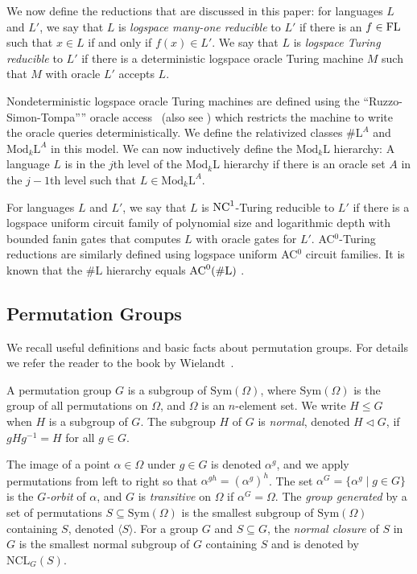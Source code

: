 \documentclass[11pt]{article}
\newcommand{\Mod}[1]{\ensuremath{\mathrm{Mod}_{#1}\mathrm{L}}}
\newcommand{\Lo}{\ensuremath{\mathrm{L}}}
\newcommand{\FL}{\mbox{\rm FL}}
\newcommand{\NC}{\mbox{\rm NC}}
\newcommand{\NCone}{\ensuremath{\NC^1}}
\newcommand{\ACzero}{\mbox{\ensuremath{\textrm{AC}^0}}}
\newcommand{\NCL}[2]{\ensuremath{\mathrm{NCL}_{#1}({#2})}}
\renewcommand{\angle}[1]{\langle #1\rangle}
\newcommand{\Sym}[1]{\ensuremath{\mathrm{Sym}\left({#1}\right)}}
\begin{document}
We now define the reductions that are discussed in this paper: for
languages $L$ and $L'$, we say that $L$ is \emph{logspace many-one
reducible} to $L'$ if there is an $f\in\FL$ such that $x\in L$ if and
only if $f(x)\in L'$. We say that $L$ is \emph{logspace Turing
reducible} to $L'$ if there is a deterministic logspace oracle Turing
machine $M$ such that $M$ with oracle $L'$ accepts $L$.

Nondeterministic logspace oracle Turing machines are defined using the
``Ruzzo-Simon-Tompa'''' oracle access~\cite{RST} (also see
\cite{allender96relationships,allender99complexity}) which restricts
the machine to write the oracle queries deterministically. We define
the relativized classes $\#\Lo^A$ and $\Mod{k}^A$ in this model. We
can now inductively define the $\Mod{k}$ hierarchy: A language $L$ is
in the $j$th level of the $\Mod{k}$ hierarchy if there is an oracle
set $A$ in the $j-1$th level such that $L\in\Mod{k}^A$.

For languages $L$ and $L'$, we say that $L$ is $\NCone$-Turing
reducible to $L'$ if there is a logspace uniform circuit family of
polynomial size and logarithmic depth with bounded fanin gates that
computes $L$ with oracle gates for $L'$. AC$^0$-Turing reductions are
similarly defined using logspace uniform AC$^0$ circuit families. It
is known that the $\#\Lo$ hierarchy equals $\ACzero(\#\Lo)$
\cite{allender96relationships}.

\subsection{Permutation Groups}

We recall useful definitions and basic facts about permutation
groups. For details we refer the reader to the book by
Wielandt~\cite{wielandt64finite}.

A permutation group $G$ is a subgroup of $\Sym{\Omega}$, where
$\Sym{\Omega}$ is the group of all permutations on $\Omega$, and
$\Omega$ is an $n$-element set. We write $H\leq G$ when $H$ is a
subgroup of $G$. The subgroup $H$ of $G$ is \emph{normal}, denoted
$H\lhd G$, if $gHg^{-1}=H$ for all $g\in G$. 

The image of a point $\alpha\in\Omega$ under $g\in G$ is denoted
$\alpha^g$, and we apply permutations from left to right so that
$\alpha^{gh}=(\alpha^g)^h$.  The set $\alpha^G=\{\alpha^g\mid g\in
G\}$ is the \emph{$G$-orbit} of $\alpha$, and $G$ is \emph{transitive}
on $\Omega$ if $\alpha^G=\Omega$. The \emph{group generated} by a set
of permutations $S\subseteq\Sym{\Omega}$ is the smallest subgroup of
$\Sym{\Omega}$ containing $S$, denoted $\angle{S}$. For a group $G$
and $S\subseteq G$, the \emph{normal closure} of $S$ in $G$ is
the smallest normal subgroup of $G$ containing $S$ and is denoted
by $\NCL{G}{S}$.
\end{document}
